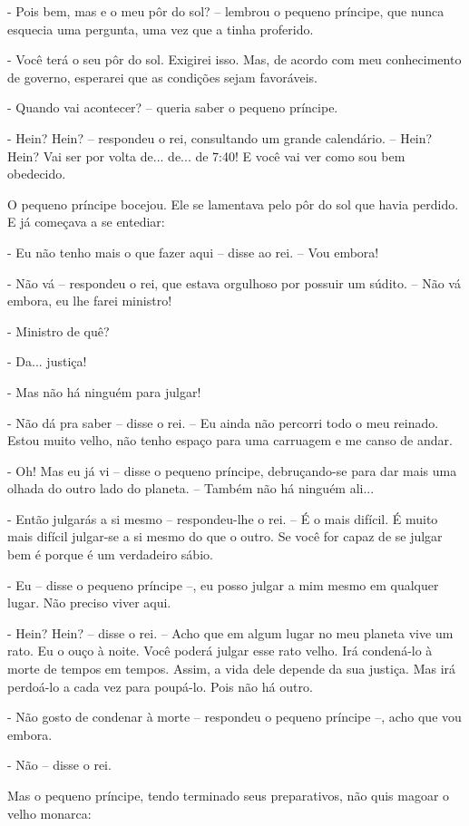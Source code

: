 - Pois bem, mas e o meu pôr do sol? -- lembrou o pequeno príncipe, que
nunca esquecia uma pergunta, uma vez que a tinha proferido.

- Você terá o seu pôr do sol. Exigirei isso. Mas, de acordo com meu
conhecimento de governo, esperarei que as condições sejam favoráveis.

- Quando vai acontecer? -- queria saber o pequeno príncipe.

- Hein? Hein? -- respondeu o rei, consultando um grande calendário. --
Hein? Hein? Vai ser por volta de... de... de 7:40! E você vai ver como
sou bem obedecido.

O pequeno príncipe bocejou. Ele se lamentava pelo pôr do sol que havia
perdido. E já começava a se entediar:

- Eu não tenho mais o que fazer aqui -- disse ao rei. -- Vou embora!

- Não vá -- respondeu o rei, que estava orgulhoso por possuir um súdito.
-- Não vá embora, eu lhe farei ministro!

- Ministro de quê?

- Da... justiça!

- Mas não há ninguém para julgar!

- Não dá pra saber -- disse o rei. -- Eu ainda não percorri todo o meu
reinado. Estou muito velho, não tenho espaço para uma carruagem e me
canso de andar.

- Oh! Mas eu já vi -- disse o pequeno príncipe, debruçando-se para dar
mais uma olhada do outro lado do planeta. -- Também não há ninguém
ali...

- Então julgarás a si mesmo -- respondeu-lhe o rei. -- É o mais difícil.
É muito mais difícil julgar-se a si mesmo do que o outro. Se você for
capaz de se julgar bem é porque é um verdadeiro sábio.

- Eu -- disse o pequeno príncipe --, eu posso julgar a mim mesmo em
qualquer lugar. Não preciso viver aqui.

- Hein? Hein? -- disse o rei. -- Acho que em algum lugar no meu planeta
vive um rato. Eu o ouço à noite. Você poderá julgar esse rato velho. Irá
condená-lo à morte de tempos em tempos. Assim, a vida dele depende da
sua justiça. Mas irá perdoá-lo a cada vez para poupá-lo. Pois não há
outro.

- Não gosto de condenar à morte -- respondeu o pequeno príncipe --, acho
que vou embora.

- Não -- disse o rei.

Mas o pequeno príncipe, tendo terminado seus preparativos, não quis
magoar o velho monarca:

